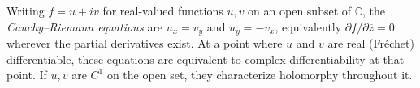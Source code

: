 
Writing $f=u+iv$ for real-valued functions $u,v$ on an open subset of $\mathbb C$, the \emph{Cauchy--Riemann equations} are $u_x=v_y$ and $u_y=-v_x$, equivalently $\partial f/\partial\overline z=0$ wherever the partial derivatives exist. At a point where $u$ and $v$ are real (Fréchet) differentiable, these equations are equivalent to complex differentiability at that point. If $u,v$ are $C^1$ on the open set, they characterize holomorphy throughout it.
